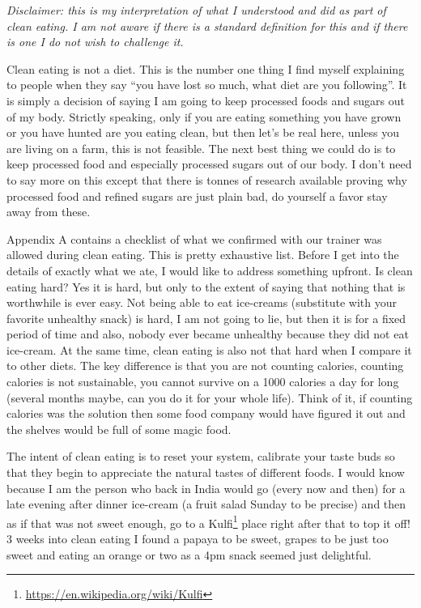 \documentclass[
  oneside]{book}
\DeclareRobustCommand{\href}[2]{#2\footnote{\url{#1}}}
\begin{document}
\emph{Disclaimer: this is my interpretation of what I understood and did as part of clean eating. I am not aware if there is a standard definition for this and if there is one I do not wish to challenge it.}

Clean eating is not a diet. This is the number one thing I find myself explaining to people when they say ``you have lost so much, what diet are you following''. It is simply a decision of saying I am going to keep processed foods and sugars out of my body. Strictly speaking, only if you are eating something you have grown or you have hunted are you eating clean, but then let's be real here, unless you are living on a farm, this is not feasible. The next best thing we could do is to keep processed food and especially processed sugars out of our body. I don't need to say more on this except that there is tonnes of research available proving why processed food and refined sugars are just plain bad, do yourself a favor stay away from these.

Appendix A contains a checklist of what we confirmed with our trainer was allowed during clean eating. This is pretty exhaustive list. Before I get into the details of exactly what we ate, I would like to address something upfront. Is clean eating hard? Yes it is hard, but only to the extent of saying that nothing that is worthwhile is ever easy. Not being able to eat ice-creams (substitute with your favorite unhealthy snack) is hard, I am not going to lie, but then it is for a fixed period of time and also, nobody ever became unhealthy because they did not eat ice-cream. At the same time, clean eating is also not that hard when I compare it to other diets. The key difference is that you are not counting calories, counting calories is not sustainable, you cannot survive on a 1000 calories a day for long (several months maybe, can you do it for your whole life). Think of it, if counting calories was the solution then some food company would have figured it out and the shelves would be full of some magic food.

The intent of clean eating is to reset your system, calibrate your taste buds so that they begin to appreciate the natural tastes of different foods. I would know because I am the person who back in India would go (every now and then) for a late evening after dinner ice-cream (a fruit salad Sunday to be precise) and then as if that was not sweet enough, go to a \href{https://en.wikipedia.org/wiki/Kulfi}{Kulfi} place right after that to top it off! 3 weeks into clean eating I found a papaya to be sweet, grapes to be just too sweet and eating an orange or two as a 4pm snack seemed just delightful.
\end{document}
